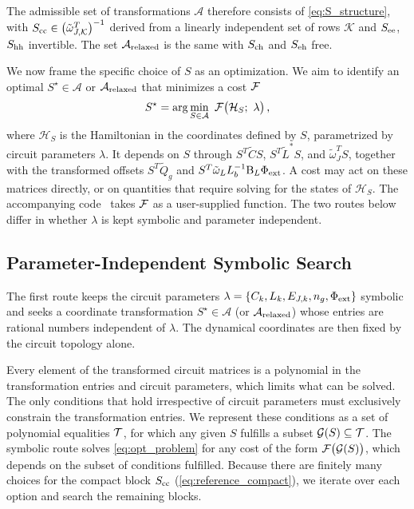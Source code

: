 The admissible set of transformations $\mathcal{A}$ therefore consists of \cref{eq:S_structure}, with $S_{\rm cc}\in\bigl(\tilde\omega_{J,\mathcal K}^T\bigr)^{-1}$ derived from a linearly independent set of rows $\mathcal{K}$ and $S_{\rm ee}$, $S_{\rm hh}$ invertible.
The set $\mathcal{A}_{\rm relaxed}$ is the same with $S_{\rm ch}$ and $S_{\rm eh}$ free.

We now frame the specific choice of $S$ as an optimization.
We aim to identify an optimal $S^\star \in \mathcal{A}$ or $\mathcal{A_{\rm relaxed}}$ that minimizes a cost $\mathcal{F}$
\begin{align}
    S^\star=\arg\min_{S\in\mathcal A}\ \costFunc\bigl(\mathcal H_S;\ \lambda\bigr) \, ,
    \label{eq:opt_problem}
\end{align}
where $\mathcal H_S$ is the Hamiltonian in the coordinates defined by $S$, parametrized by circuit parameters $\lambda$.
It depends on $S$ through $S^T\tilde CS$, $S^T\tilde L^*S$, and $\tilde\omega_J^TS$, together with the transformed offsets $S^T\tilde Q_g$ and $S^T\tilde\omega_L L_b^{-1}\mathrm{B}_L\Phi_{\rm ext}$.
A cost may act on these matrices directly, or on quantities that require solving for the states of $\mathcal H_S$.
The accompanying code~\cite{weissler2026circuitquantizationcode} takes $\mathcal{F}$ as a user-supplied function.
The two routes below differ in whether $\lambda$ is kept symbolic and parameter independent.

\subsection{Parameter-Independent Symbolic Search}\label{sec:SymbolicSearch}

The first route keeps the circuit parameters $\lambda = \{C_k, L_k, E_{J,k}, n_g, \Phi_{\rm ext}\}$ symbolic and seeks a coordinate transformation $S^\star \in \mathcal{A}$ (or $\mathcal{A}_{\rm relaxed}$) whose entries are rational numbers independent of $\lambda$.
The dynamical coordinates are then fixed by the circuit topology alone.

Every element of the transformed circuit matrices is a polynomial in the transformation entries and circuit parameters, which limits what can be solved.
The only conditions that hold irrespective of circuit parameters must exclusively constrain the transformation entries.
We represent these conditions as a set of polynomial equalities $\mathcal{T}$, for which any given $S$ fulfills a subset $\mathcal{G}(S) \subseteq \mathcal{T}$.
The symbolic route solves \cref{eq:opt_problem} for any cost of the form $\mathcal{F}\bigl(\mathcal{G}(S)\bigr)$, which depends on the subset of conditions fulfilled.
Because there are finitely many choices for the compact block $S_{\rm cc}$ (\cref{eq:reference_compact}), we iterate over each option and search the remaining blocks.

